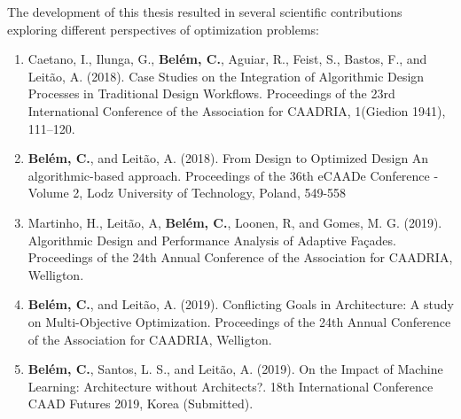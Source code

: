 The development of this thesis resulted in several scientific contributions exploring different perspectives of optimization problems:

\begin{enumerate}
\item Caetano, I., Ilunga, G., \textbf{Belém, C.}, Aguiar, R., Feist, S., Bastos, F., and Leitão, A. (2018). Case Studies on the Integration of Algorithmic Design Processes in Traditional Design Workflows. Proceedings of the 23rd International Conference of the Association for CAADRIA, 1(Giedion 1941), 111–120.

\item \textbf{Belém, C.}, and Leitão, A. (2018). From Design to Optimized Design An algorithmic-based approach. Proceedings of the 36th eCAADe Conference - Volume 2, Lodz University of Technology, Poland, 549-558

\item Martinho, H., Leitão, A, \textbf{Belém, C.}, Loonen, R, and Gomes, M. G. (2019). Algorithmic Design and Performance Analysis of Adaptive Façades. Proceedings of the 24th Annual Conference of the Association for CAADRIA, Welligton.

\item \textbf{Belém, C.}, and Leitão, A. (2019). Conflicting Goals in Architecture: A study on Multi-Objective Optimization. Proceedings of the 24th Annual Conference of the Association for CAADRIA, Welligton.

\item \textbf{Belém, C.}, Santos, L. S., and Leitão, A. (2019). On the Impact of Machine Learning: Architecture without Architects?. 18th International Conference CAAD Futures 2019, Korea (Submitted).


\end{enumerate}



